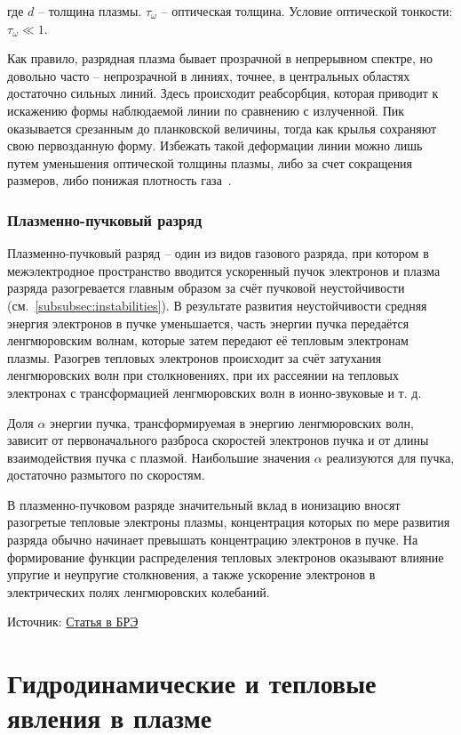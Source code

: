 \documentclass[10pt, a4paper]{article}
\let\stdsection\section
\renewcommand\section{\newpage\stdsection}
\begin{document}
где $d$ -- толщина плазмы. $\tau_\omega$ -- оптическая толщина. Условие оптической тонкости: $\tau_\omega\ll1$.

Как правило, разрядная плазма бывает прозрачной в непрерывном спектре, но довольно часто -- непрозрачной в линиях, точнее, в центральных областях достаточно сильных линий. Здесь происходит реабсорбция, которая приводит к искажению формы наблюдаемой линии по сравнению с излученной. Пик оказывается срезанным до планковской величины, тогда как крылья сохраняют свою первозданную форму. Избежать такой деформации линии можно лишь путем уменьшения оптической толщины плазмы, либо за счет сокращения размеров, либо понижая плотность газа~\cite{raizer}.	

\subsubsection{Плазменно-пучковый разряд}

Плазменно-пучковый разряд -- один из видов газового разряда, при котором в межэлектродное пространство вводится ускоренный пучок электронов и плазма разряда разогревается главным образом за счёт пучковой неустойчивости (см.~\ref{subsubsec:instabilities}). В результате развития неустойчивости средняя энергия электронов в пучке уменьшается, часть энергии пучка передаётся ленгмюровским волнам, которые затем передают её тепловым электронам плазмы. Разогрев тепловых электронов происходит за счёт затухания ленгмюровских волн при столкновениях, при их рассеянии на тепловых электронах с трансформацией ленгмюровских волн в ионно-звуковые и т. д. 

Доля $\alpha$ энергии пучка, трансформируемая в энергию ленгмюровских волн, зависит от первоначального разброса скоростей электронов пучка и от длины взаимодействия пучка с плазмой. Наибольшие значения $\alpha$ реализуются для пучка, достаточно размытого по скоростям.

В плазменно-пучковом разряде значительный вклад в ионизацию вносят разогретые тепловые электроны плазмы, концентрация которых по мере развития разряда обычно начинает превышать концентрацию электронов в пучке. На формирование функции распределения тепловых электронов оказывают влияние упругие и неупругие столкновения, а также ускорение электронов в электрических полях ленгмюровских колебаний.

Источник: \href{https://bigenc.ru/physics/text/3142852}{Статья в БРЭ}

\section{Гидродинамические и тепловые явления в плазме}
\end{document}
